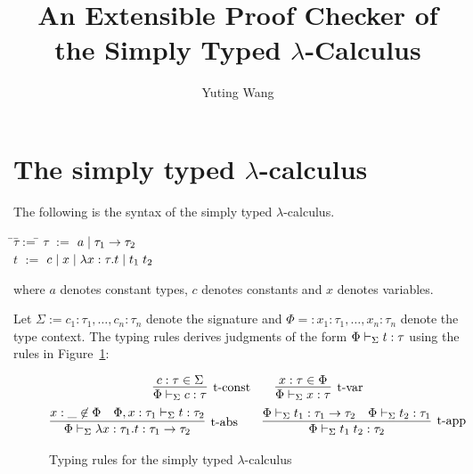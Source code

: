 \documentclass[10pt]{article}
\title{An Extensible Proof Checker of the Simply Typed $\lambda$-Calculus}
\author{Yuting Wang}
\begin{document}
\maketitle

\section{The simply typed $\lambda$-calculus}

The following is the syntax of the simply typed $\lambda$-calculus.
%
\begin{tabbing}
\qquad\=$\tau$\quad\=$:=$\quad\=\kill
\>$\tau$  \>$:=$  \>$a \; | \; \tau_1 \to \tau_2$\\
\>$t$     \>$:=$  \>$c \; | \; x \; | \; \lambda{x}:{\tau}.{t} \; | \; t_1\; t_2$
\end{tabbing}
%
where $a$ denotes constant types, $c$ denotes constants and $x$
denotes variables.

Let $\Sigma := c_1:\tau_1, \ldots, c_n:\tau_n$ denote the signature
and $\Phi =: x_1:\tau_1,\ldots,x_n:\tau_n$ denote the type context.
The typing rules derives judgments of the form
$\Phi \vdash_{\Sigma} t: \tau$ using the rules in
Figure~\ref{fig:stlc-typing-rules}:

\begin{figure}[ht!]
\begin{gather*}  
\infer[\mbox{\typconst}]{
  \typeof{\Sigma}{\Phi}{c}{\tau}
}{
  c:\tau \in \Sigma
}
\qquad
\infer[\mbox{\typvar}]{
  \typeof{\Sigma}{\Phi}{x}{\tau}
}{
  x:\tau \in \Phi
}
\\
\infer[\mbox{\typabs}]{
  \typeof{\Sigma}{\Phi}{\tabs{x}{\tau_1}{t}}{\tau_1 \to \tau_2}
}{
  x:\_ \not\in\Phi 
  &
  \typeof{\Sigma}{\Phi,x:\tau_1}{t}{\tau_2}
}
\qquad
\infer[\mbox{\typapp}]{
  \typeof{\Sigma}{\Phi}{t_1\app t_2}{\tau_2}
}{
  \typeof{\Sigma}{\Phi}{t_1}{\tau_1 \to \tau_2}
  &
  \typeof{\Sigma}{\Phi}{t_2}{\tau_1}
}
\end{gather*}  

\caption{Typing rules for the simply typed $\lambda$-calculus}
\label{fig:stlc-typing-rules}
\end{figure}
\end{document}
